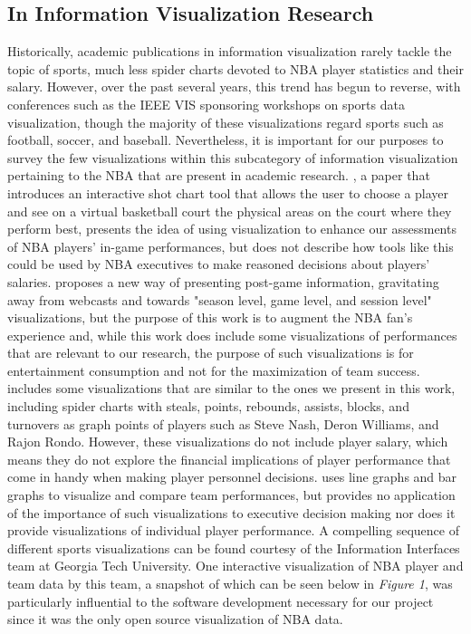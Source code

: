 \documentclass[journal]{vgtc}                %
\begin{document}
\subsection{In Information Visualization Research}
Historically, academic publications in information visualization rarely tackle the topic of sports, much less spider charts devoted to NBA player statistics and their salary. However, over the past several years, this trend has begun to reverse, with conferences such as the IEEE VIS sponsoring workshops on sports data visualization, though the majority of these visualizations regard sports such as football, soccer, and baseball. Nevertheless, it is important for our purposes to survey the few visualizations within this subcategory of information visualization pertaining to the NBA that are present in academic research. \cite{chu}, a paper that introduces an interactive shot chart tool that allows the user to choose a player and see on a virtual basketball court the physical areas on the court where they perform best, presents the idea of using visualization to enhance our assessments of NBA players' in-game performances, but does not describe how tools like this could be used by NBA executives to make reasoned decisions about players' salaries. \cite{chen} proposes a new way of presenting post-game information, gravitating away from webcasts and towards "season level, game level, and session level" visualizations, but the purpose of this work is to augment the NBA fan's experience and, while this work does include some visualizations of performances that are relevant to our research, the purpose of such visualizations is for entertainment consumption and not for the maximization of team success. \cite{pagno} includes some visualizations that are similar to the ones we present in this work, including spider charts with steals, points, rebounds, assists, blocks, and turnovers as graph points of players such as Steve Nash, Deron Williams, and Rajon Rondo. However, these visualizations do not include player salary, which means they do not explore the financial implications of player performance that come in handy when making player personnel decisions. \cite{reyna} uses line graphs and bar graphs to visualize and compare team performances, but provides no application of the importance of such visualizations to executive decision making nor does it provide visualizations of individual player performance. A compelling sequence of different sports visualizations can be found courtesy of the Information Interfaces team at Georgia Tech University. One interactive visualization of NBA player and team data by this team, a snapshot of which can be seen below in \emph{Figure 1}, was particularly influential to the software development necessary for our project since it was the only open source visualization of NBA data.
\end{document}
